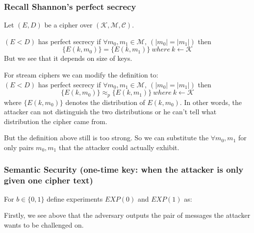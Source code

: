 \documentclass[12pt]{book}
\begin{document}
\subsubsection{Recall Shannon's perfect secrecy}

Let $(E,D)$ be a cipher over $(\mathcal{K},\mathcal{M},\mathcal{C})$.

$(E<D)$ has perfect secrecy if $\forall m_{0},m_{1}\in\mathcal{M},\ (|m_{0}|=|m_{1}|)$ then $$\{E(k,m_{0})\}=\{E(k,m_{1})\}\ where\ k\leftarrow\mathcal{K}$$But we see that it depends on size of keys.

For stream ciphers we can modify the definition to:\\
$(E<D)$ has perfect secrecy if $\forall m_{0},m_{1}\in\mathcal{M},\ (|m_{0}|=|m_{1}|)$ then $$\{E(k,m_{0})\}\approx_{p}\{E(k,m_{1})\}\ where\ k\leftarrow\mathcal{K}$$where $\{E(k,m_{0})\}$ denotes the distribution of $E(k,m_{0})$. In other words, the attacker can not distinguish the two distributions or he can't tell what distribution the cipher came from.

But the definition above still is too strong. So we can substitute the $\forall m_{0},m_{1}$ for only pairs $m_{0},m_{1}$ that the attacker could actually exhibit.

\subsubsection{Semantic Security (one-time key: when the attacker is only given one cipher text)}
For $b\in\{0,1\}$ define experiments $EXP(0)$ and $EXP(1)$ as:
\begin{center}
\end{center}
Firstly, we see above that the adversary outputs the pair of messages the attacker wants to be challenged on.
\end{document}
